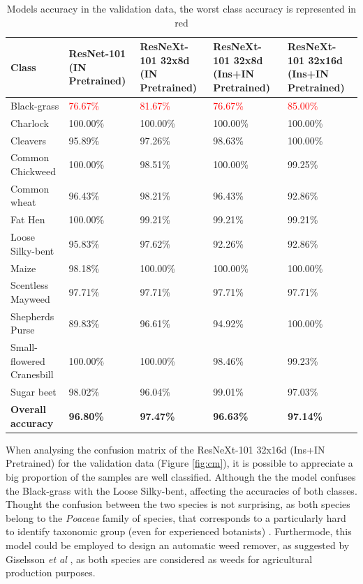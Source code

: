 \documentclass[10pt,onecolumn,titlepage,letterpaper]{article}
\begin{document}
\begin{table}[h]
	\begin{center}
		\begin{tabular}{|p{4.1cm}|p{2.8cm}|p{2.8cm}|p{2.8cm}|p{2.8cm}|}
			\hline
			Class & ResNet-101 (IN Pretrained) & ResNeXt-101 32x8d (IN Pretrained) & ResNeXt-101 32x8d (Ins+IN Pretrained) & ResNeXt-101 32x16d (Ins+IN Pretrained)\\
			\hline\hline
			Black-grass &  \textcolor{red}{76.67\%} &\textcolor{red}{81.67\%}  & \textcolor{red}{76.67\%}  & \textcolor{red}{85.00\%}  \\
			Charlock & 100.00\% & 100.00\% & 100.00\% & 100.00\% \\
			Cleavers & 95.89\% & 97.26\% & 98.63\% & 100.00\%  \\
			Common Chickweed & 100.00\% & 98.51\% & 100.00\% & 99.25\%\\
			Common wheat & 96.43\%  & 98.21\% & 96.43\% & 92.86\%\\
			Fat Hen & 100.00\% & 99.21\% & 99.21\% & 99.21\% \\
			Loose Silky-bent & 95.83\% & 97.62\% & 92.26\% & 92.86\% \\
			Maize & 98.18\% & 100.00\% & 100.00\% & 100.00\% \\
			Scentless Mayweed & 97.71\% & 97.71\% & 97.71\% & 97.71\% \\
			Shepherds Purse & 89.83\% & 96.61\% & 94.92\% & 100.00\% \\
			Small-flowered Cranesbill & 100.00\% & 100.00\% & 98.46\% & 99.23\% \\
			Sugar beet & 98.02\% & 96.04\% & 99.01\% & 97.03\% \\
			\hline
			\textbf{Overall accuracy} & \textbf{96.80\%} & \textbf{97.47\%} & \textbf{96.63\%} & \textbf{97.14\%} \\
			\hline
		\end{tabular}
	\end{center}
	\caption{Models accuracy in the validation data, the worst class accuracy is represented in red}
	\label{table:val}
\end{table}

When analysing the confusion matrix of the ResNeXt-101 32x16d (Ins+IN Pretrained) for the validation data (Figure \ref{fig:cm}), it is possible to appreciate a big proportion of the samples are well classified. Although the the model confuses the Black-grass with the Loose Silky-bent, affecting the accuracies of both classes. Thought the confusion between the two species is not surprising, as both species belong to the \textit{Poaceae} family of species, that corresponds to a particularly hard to identify taxonomic group (even for experienced botanists) \cite{Nesbitt2016}. Furthermode, this model could be employed to design an automatic weed remover, as suggested by Giselsson \textit{et al} \cite{Giselsson2017}, as both species are considered as weeds for agricultural production purposes.
\end{document}
